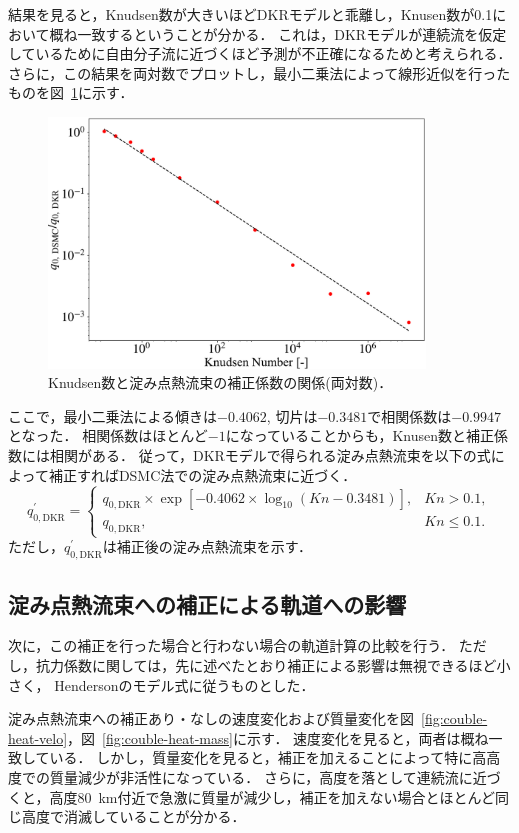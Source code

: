 結果を見ると，Knudsen数が大きいほどDKRモデルと乖離し，Knusen数が0.1において概ね一致するということが分かる．
これは，DKRモデルが連続流を仮定しているために自由分子流に近づくほど予測が不正確になるためと考えられる．
さらに，この結果を両対数でプロットし，最小二乗法によって線形近似を行ったものを図~\ref{fig:couble-kn-heat}に示す．
\begin{figure}[H]
    \centering
    \includegraphics[width=10cm]{fig/couple/kn-heat.pdf}
    \caption{Knudsen数と淀み点熱流束の補正係数の関係(両対数)．}
    \label{fig:couble-kn-heat}
\end{figure}
ここで，最小二乗法による傾きは$-0.4062$, 切片は$-0.3481$で相関係数は$-0.9947$となった．
相関係数はほとんど$-1$になっていることからも，Knusen数と補正係数には相関がある．
従って，DKRモデルで得られる淀み点熱流束を以下の式によって補正すればDSMC法での淀み点熱流束に近づく．
\begin{equation}
    q_{0,\mathrm{DKR}}^\prime =
    \begin{cases}
    q_{0,\mathrm{DKR}}\times\exp\left[{-0.4062\times\log_{10}\left({Kn}-0.3481\right)}\right], & Kn > 0.1, \\
    q_{0,\mathrm{DKR}}, & Kn \le 0.1.
    \end{cases}
\end{equation}
ただし，$q_{0,\mathrm{DKR}}^\prime$は補正後の淀み点熱流束を示す．


\subsection{淀み点熱流束への補正による軌道への影響}
次に，この補正を行った場合と行わない場合の軌道計算の比較を行う．
ただし，抗力係数に関しては，先に述べたとおり補正による影響は無視できるほど小さく，
Hendersonのモデル式に従うものとした．

淀み点熱流束への補正あり・なしの速度変化および質量変化を図~\ref{fig:couble-heat-velo}，図~\ref{fig:couble-heat-mass}に示す．
速度変化を見ると，両者は概ね一致している．
しかし，質量変化を見ると，補正を加えることによって特に高高度での質量減少が非活性になっている．
さらに，高度を落として連続流に近づくと，高度80~km付近で急激に質量が減少し，補正を加えない場合とほとんど同じ高度で消滅していることが分かる．

